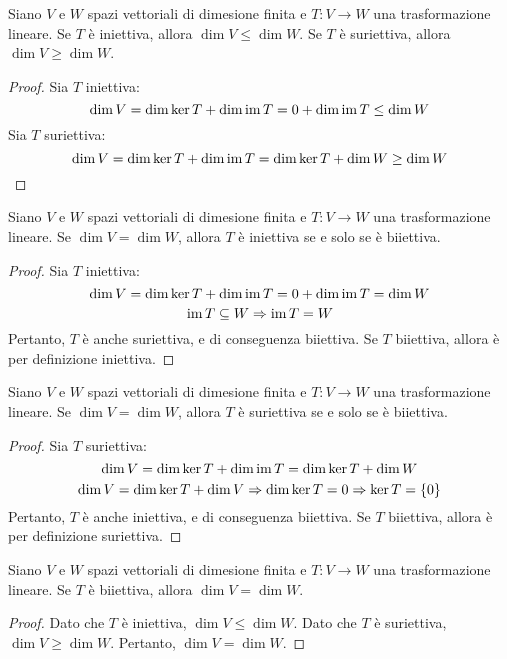 \begin{corollary}
  Siano $V$ e $W$ spazi vettoriali di dimesione finita e $T:V\to W$ una trasformazione lineare.
  Se $T$ è iniettiva, allora $\dim V\le \dim W$.
  Se $T$ è suriettiva, allora $\dim V\ge \dim W$.
\end{corollary}
\begin{proof}
  \hfill\break
  \noindent
  Sia $T$ iniettiva:
  $$\dim V=\dim \ker T+\dim \operatorname{im} T=0+\dim \operatorname{im} T\le \dim W$$
  Sia $T$ suriettiva:
  $$\dim V=\dim \ker T+\dim \operatorname{im} T=\dim \ker T + \dim W \ge \dim W$$
\end{proof}

\begin{corollary}
  Siano $V$ e $W$ spazi vettoriali di dimesione finita e $T:V\to W$ una trasformazione lineare.
  Se $\dim V=\dim W$, allora $T$ è iniettiva se e solo se è biiettiva.
\end{corollary}
\begin{proof}
  Sia $T$ iniettiva:
  $$\dim V = \dim \ker T+\dim \operatorname{im} T=0+\dim \operatorname{im} T=\dim W$$
  $$\operatorname{im} T\subseteq W\Rightarrow \operatorname{im} T = W$$
  Pertanto, $T$ è anche suriettiva, e di conseguenza biiettiva.
  Se $T$ biiettiva, allora è per definizione iniettiva.
\end{proof}

\begin{corollary}
  Siano $V$ e $W$ spazi vettoriali di dimesione finita e $T:V\to W$ una trasformazione lineare.
  Se $\dim V=\dim W$, allora $T$ è suriettiva se e solo se è biiettiva.
\end{corollary}
\begin{proof}
  Sia $T$ suriettiva:
  $$\dim V = \dim \ker T+\dim \operatorname{im} T=\dim \ker T+\dim W$$
  $$\dim V=\dim \ker T + \dim V\Rightarrow \dim \ker T=0\Rightarrow \ker T=\left\{ 0 \right\}$$
  Pertanto, $T$ è anche iniettiva, e di conseguenza biiettiva.
  Se $T$ biiettiva, allora è per definizione suriettiva.
\end{proof}

\begin{corollary}
  Siano $V$ e $W$ spazi vettoriali di dimesione finita e $T:V\to W$ una trasformazione lineare.
  Se $T$ è biiettiva, allora $\dim V=\dim W$.
\end{corollary}
\begin{proof}
  Dato che $T$ è iniettiva, $\dim V\le \dim W$. Dato che $T$ è suriettiva, $\dim V\ge \dim W$.
  Pertanto, $\dim V=\dim W$.
\end{proof}

